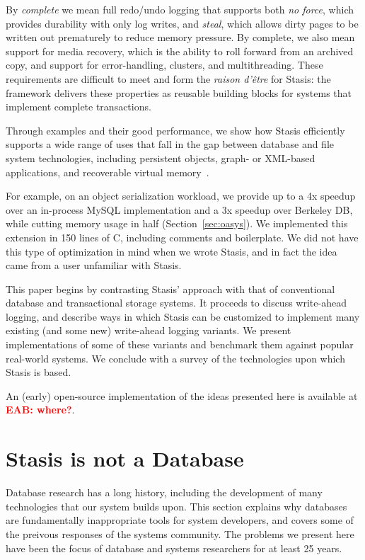 \documentclass[letterpaper,twocolumn,10pt]{article}
\newcommand{\yad}{Stasis\xspace}
\newcommand{\yads}{Stasis'\xspace}
\newcommand{\eab}[1]{\textcolor{red}{\bf EAB: #1}}
\begin{document}
By {\em complete} we mean full redo/undo logging that supports
both {\em no force}, which provides durability with only log writes,
and {\em steal}, which allows dirty pages to be written out prematurely
to reduce memory pressure. By complete, we also
mean support for media recovery, which is the ability to roll
forward from an archived copy, and support for error-handling,
clusters, and multithreading. These requirements are difficult
to meet and form the {\em raison d'\^etre} for \yad{}: the framework
delivers these properties as reusable building blocks for systems
that implement complete transactions.

Through examples and their good performance, we show how \yad{}
efficiently supports a wide range of uses that fall in the gap between 
database and file system technologies, including
persistent objects, graph- or XML-based applications, and recoverable
virtual memory~\cite{lrvm}.  

For example, on an object serialization workload, we provide up to 
a 4x speedup over an in-process MySQL implementation and a 3x speedup over Berkeley DB, while 
cutting memory usage in half (Section~\ref{sec:oasys}). 
We implemented this extension in 150 lines of C, including comments and boilerplate.  We did not have this type of optimization
in mind when we wrote \yad, and in fact the idea came from a
user unfamiliar with \yad.


This paper begins by contrasting \yads approach with that of
conventional database and transactional storage systems.  It proceeds
to discuss write-ahead logging, and describe ways in which \yad can be
customized to implement many existing (and some new) write-ahead
logging variants.  We present implementations of some of these variants and
benchmark them against popular real-world systems.  We
conclude with a survey of the technologies upon which \yad is based.

An (early) open-source implementation of
the ideas presented here is available at \eab{where?}.

\section{\yad is not a Database}
\label{sec:notDB}

Database research has a long history, including the development of
many technologies that our system builds upon.  This section explains
why databases are fundamentally inappropriate tools for system
developers, and covers some of the preivous responses of the systems
community.  The problems we present here have been the focus of
database and systems researchers for at least 25 years.
\end{document}
